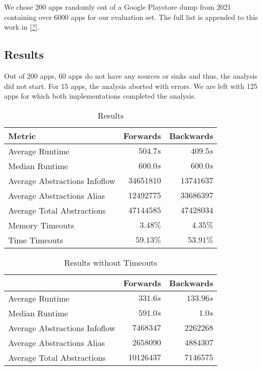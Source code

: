\documentclass[../draft.tex]{subfiles}
\begin{document}
    We chose 200 apps randomly out of a Google Playstore dump from 2021 containing over 6000 apps for our evaluation set. The full list is appended to this work in \autoref{?}.

    \subsection{Results}
    Out of 200 apps, 60 apps do not have any sources or sinks and thus, the analysis did not start. For 15 apps, the analysis aborted with errors. We are left with 125 apps for which both implementations completed the analysis.

    
    \begin{table}[ht]
        \centering
        \begin{tabular}{l | r | r}
            \textbf{Metric} & \textbf{Forwards} & \textbf{Backwards}\\
            \hline\hline
            Average Runtime & $504.7s$ & $409.5s$\\
            Median Runtime & $600.0s$ & $600.0s$\\
            \hline
            Average Abstractions Infoflow & $34651810$ & $13741637$\\
            Average Abstractions Alias & $12492775$ & $33686397$\\
            Average Total Abstractions & $47144585$ & $47428034$\\
            \hline
            Memory Timeouts & $3.48\%$ & $4.35\%$\\
            Time Timeouts & $59.13\%$ & $53.91\%$\\                     
        \end{tabular}
        \caption{Results}
        \label{t:realworldresults}
    \end{table}

    \begin{table}[ht]
        \centering
        \begin{tabular}{l | r | r}
            & \textbf{Forwards} & \textbf{Backwards}\\
            \hline\hline
            Average Runtime & $331.6s$ & $133.96s$\\
            Median Runtime & $591.0s$ & $1.0s$\\
            \hline
            Average Abstractions Infoflow & $7468347$ & $2262268$\\
            Average Abstractions Alias & $2658090$ & $4884307$\\
            Average Total Abstractions & $10126437$ & $7146575$\\
            \hline
        \end{tabular}
        \caption{Results without Timeouts}
        \label{t:realworldresultswithouttimeout}
    \end{table}
\end{document}
